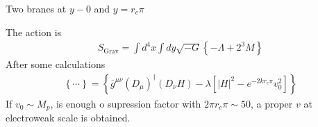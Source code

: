 \documentclass[12pt,letterpaper]{article}
\begin{document}
Two branes at $y-0$ and $y=r_c\pi$

The action is
\begin{align*}
  S_{\text{Grav}}=\int d^4x\int dy\sqrt{-G}\left\{ 
-\Lambda+2^3M \right\}
\end{align*}
After some calculations
\begin{align*}
  \left\{ \cdots \right\}
=\left\{ \bar{g}^{\mu\nu}(D_{\mu})^{\dagger}(D_{\nu}H)
-\lambda \left[ \left| H \right|^2 -e^{-2k r_c\pi}v_0^2\right] \right\}
\end{align*}
If $v_0\sim M_p$, is enough o supression factor with $2\pi r_c \pi\sim
50$, a proper $v$ at electroweak scale is obtained.


\end{document}
